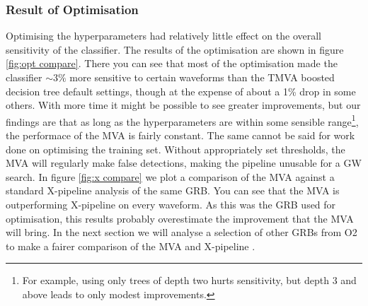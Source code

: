 \documentclass[11pt]{cuthesis}
\newcommand{\xp}{X-pipeline }
\begin{document}
\subsubsection{Result of Optimisation}
Optimising the hyperparameters had relatively little effect on the overall sensitivity of the classifier. The results of the optimisation are shown in figure \ref{fig:opt compare}. There you can see that most of the optimisation made the classifier $\sim 3\%$  more sensitive to certain waveforms than the TMVA boosted decision tree default settings, though at the expense of about a 1\% drop in some others. With more time it might be possible to see greater improvements, but our findings are that as long as the hyperparameters are within some sensible range\footnote{For example, using only trees of depth two hurts sensitivity, but depth 3 and above leads to only modest improvements.}, the performace of the MVA is fairly constant. The same cannot be said for work done on optimising the training set. Without appropriately set thresholds, the MVA will regularly make false detections, making the pipeline unusable for a GW search. In figure \ref{fig:x compare} we plot a comparison of the MVA against a standard \xp analysis of the same GRB. You can see that the MVA is outperforming \xp on every waveform. As this was the GRB used for optimisation, this results probably overestimate the improvement that the MVA will bring. In the next section we will analyse a selection of other GRBs from O2 to make a fairer comparison of the MVA and \xp.
\end{document}
